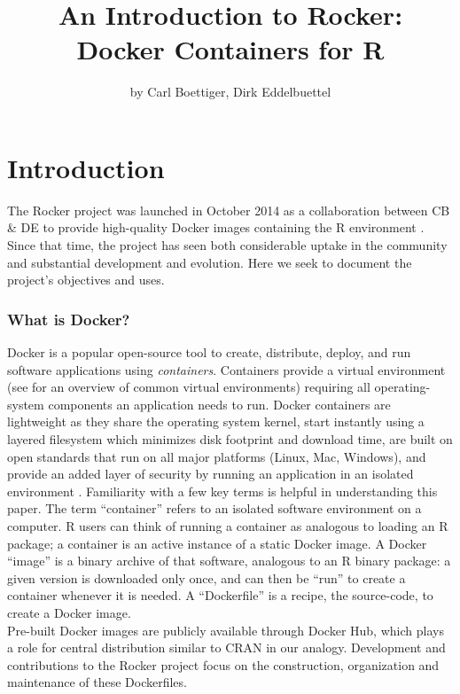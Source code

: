 \title{An Introduction to Rocker:\\
Docker Containers for R}
\author{by Carl Boettiger, Dirk Eddelbuettel}

\maketitle


\section{Introduction}\label{introduction}

The Rocker project was launched in October 2014 as a collaboration
between CB \& DE to provide high-quality Docker images containing the R
environment \citep{edd2014}. Since that time, the project has seen both
considerable uptake in the community and substantial development and
evolution. Here we seek to document the project's objectives and uses.

\subsubsection{What is Docker?}\label{what-is-docker}

Docker is a popular open-source tool to create, distribute, deploy, and
run software applications using \emph{containers}. Containers provide a
virtual environment (see \citet{Clark2014} for an overview of common
virtual environments) requiring all operating-system components an
application needs to run. Docker containers are lightweight as they
share the operating system kernel, start instantly using a layered
filesystem which minimizes disk footprint and download time, are built
on open standards that run on all major platforms (Linux, Mac, Windows),
and provide an added layer of security by running an application in an
isolated environment \citep{what-docker}. Familiarity with a few key
terms is helpful in understanding this paper. The term ``container''
refers to an isolated software environment on a computer. R users can
think of running a container as analogous to loading an R package; a
container is an active instance of a static Docker image. A Docker
``image'' is a binary archive of that software, analogous to an R binary
package: a given version is downloaded only once, and can then be
``run'' to create a container whenever it is needed. A ``Dockerfile'' is
a recipe, the source-code, to create a Docker image.\\
Pre-built Docker images are publicly available through Docker Hub, which
plays a role for central distribution similar to CRAN in our analogy.
Development and contributions to the Rocker project focus on the
construction, organization and maintenance of these Dockerfiles.

